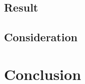 \documentclass[12pt, a4paper, titlepage]{report}
\begin{document}
  \section{Result}
  \section{Consideration}

\chapter{Conclusion}\label{chapter:conclusion}



\end{document}
